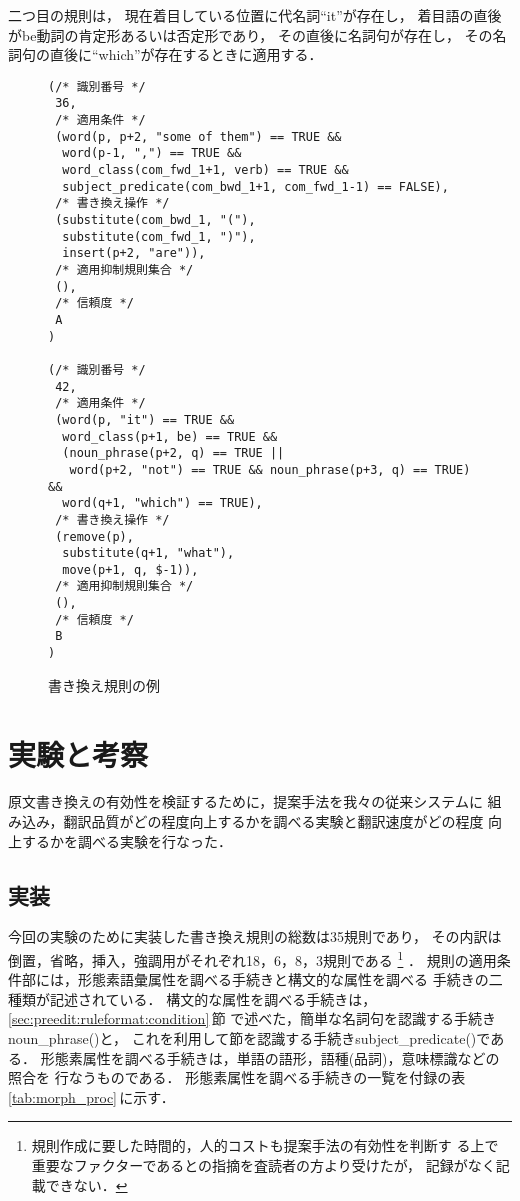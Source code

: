 二つ目の規則は，
現在着目している位置に代名詞``it''が存在し，
着目語の直後がbe動詞の肯定形あるいは否定形であり，
その直後に名詞句が存在し，
その名詞句の直後に``which''が存在するときに適用する．
\begin{figure}[tbhp]
\begin{RULE}{0.9\textwidth}
\begin{verbatim}
(/* 識別番号 */
 36,
 /* 適用条件 */
 (word(p, p+2, "some of them") == TRUE &&
  word(p-1, ",") == TRUE &&
  word_class(com_fwd_1+1, verb) == TRUE &&
  subject_predicate(com_bwd_1+1, com_fwd_1-1) == FALSE),
 /* 書き換え操作 */
 (substitute(com_bwd_1, "("),
  substitute(com_fwd_1, ")"),
  insert(p+2, "are")),
 /* 適用抑制規則集合 */
 (),
 /* 信頼度 */
 A
)

(/* 識別番号 */
 42,
 /* 適用条件 */
 (word(p, "it") == TRUE &&
  word_class(p+1, be) == TRUE &&
  (noun_phrase(p+2, q) == TRUE ||
   word(p+2, "not") == TRUE && noun_phrase(p+3, q) == TRUE) &&
  word(q+1, "which") == TRUE),
 /* 書き換え操作 */
 (remove(p),
  substitute(q+1, "what"),
  move(p+1, q, $-1)),
 /* 適用抑制規則集合 */
 (),
 /* 信頼度 */
 B
)
\end{verbatim}
\end{RULE}
\caption{書き換え規則の例}
\label{fig:rule_ex}
\end{figure}

\section{実験と考察}
\label{sec:experiment}

原文書き換えの有効性を検証するために，提案手法を我々の従来システムに
組み込み，翻訳品質がどの程度向上するかを調べる実験と翻訳速度がどの程度
向上するかを調べる実験を行なった．

\subsection{実装}

今回の実験のために実装した書き換え規則の総数は35規則であり，
その内訳は倒置，省略，挿入，強調用がそれぞれ18，6，8，3規則である
\footnote{規則作成に要した時間的，人的コストも提案手法の有効性を判断す
る上で重要なファクターであるとの指摘を査読者の方より受けたが，
記録がなく記載できない．}
． 
規則の適用条件部には，形態素語彙属性を調べる手続きと構文的な属性を調べる
手続きの二種類が記述されている．
構文的な属性を調べる手続きは，\ref{sec:preedit:ruleformat:condition}\,節
で述べた，簡単な名詞句を認識する手続きnoun\_phrase()と，
これを利用して節を認識する手続きsubject\_predicate()である．
形態素属性を調べる手続きは，単語の語形，語種(品詞)，意味標識などの照合を
行なうものである．
形態素属性を調べる手続きの一覧を付録の表\ref{tab:morph_proc}\,に示す．

